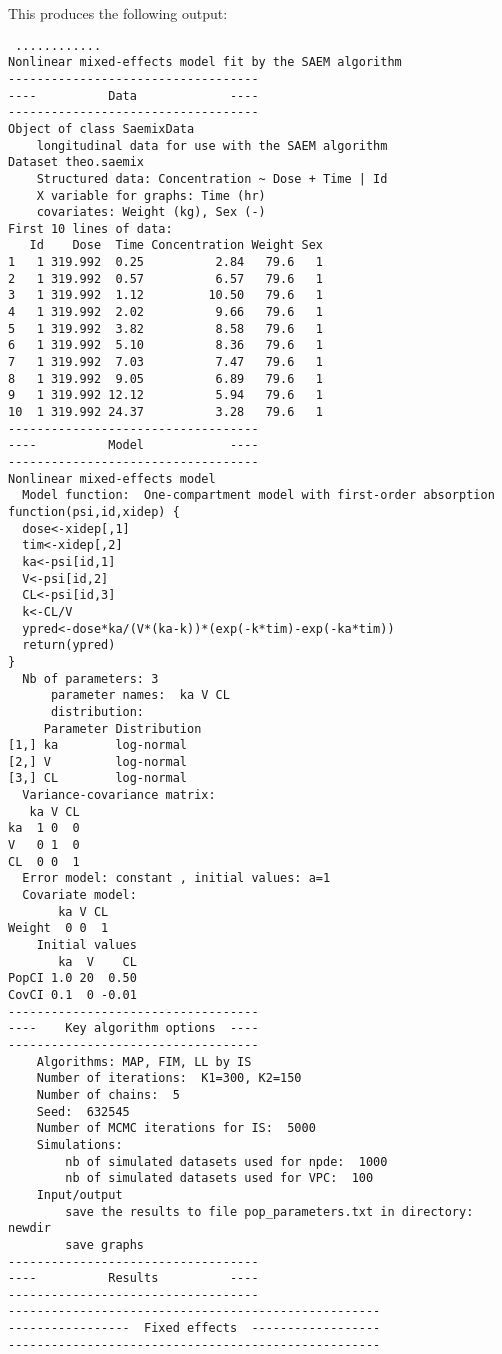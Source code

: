 This produces the following output:
\begin{verbatim}
 ............
Nonlinear mixed-effects model fit by the SAEM algorithm
-----------------------------------
----          Data             ----
-----------------------------------
Object of class SaemixData
    longitudinal data for use with the SAEM algorithm
Dataset theo.saemix 
    Structured data: Concentration ~ Dose + Time | Id 
    X variable for graphs: Time (hr) 
    covariates: Weight (kg), Sex (-) 
First 10 lines of data:
   Id    Dose  Time Concentration Weight Sex
1   1 319.992  0.25          2.84   79.6   1
2   1 319.992  0.57          6.57   79.6   1
3   1 319.992  1.12         10.50   79.6   1
4   1 319.992  2.02          9.66   79.6   1
5   1 319.992  3.82          8.58   79.6   1
6   1 319.992  5.10          8.36   79.6   1
7   1 319.992  7.03          7.47   79.6   1
8   1 319.992  9.05          6.89   79.6   1
9   1 319.992 12.12          5.94   79.6   1
10  1 319.992 24.37          3.28   79.6   1
-----------------------------------
----          Model            ----
-----------------------------------
Nonlinear mixed-effects model
  Model function:  One-compartment model with first-order absorption
function(psi,id,xidep) { 
  dose<-xidep[,1]
  tim<-xidep[,2]  
  ka<-psi[id,1]
  V<-psi[id,2]
  CL<-psi[id,3]
  k<-CL/V
  ypred<-dose*ka/(V*(ka-k))*(exp(-k*tim)-exp(-ka*tim))
  return(ypred)
}
  Nb of parameters: 3 
      parameter names:  ka V CL 
      distribution:
     Parameter Distribution
[1,] ka        log-normal  
[2,] V         log-normal  
[3,] CL        log-normal  
  Variance-covariance matrix:
   ka V CL
ka  1 0  0
V   0 1  0
CL  0 0  1
  Error model: constant , initial values: a=1 
  Covariate model:
       ka V CL
Weight  0 0  1
    Initial values
       ka  V    CL
PopCI 1.0 20  0.50
CovCI 0.1  0 -0.01
-----------------------------------
----    Key algorithm options  ----
-----------------------------------
    Algorithms: MAP, FIM, LL by IS 
    Number of iterations:  K1=300, K2=150 
    Number of chains:  5 
    Seed:  632545 
    Number of MCMC iterations for IS:  5000 
    Simulations:
        nb of simulated datasets used for npde:  1000 
        nb of simulated datasets used for VPC:  100 
    Input/output
        save the results to file pop_parameters.txt in directory:  newdir 
        save graphs
-----------------------------------
----          Results          ----
-----------------------------------
----------------------------------------------------
-----------------  Fixed effects  ------------------
----------------------------------------------------

\end{verbatim}
